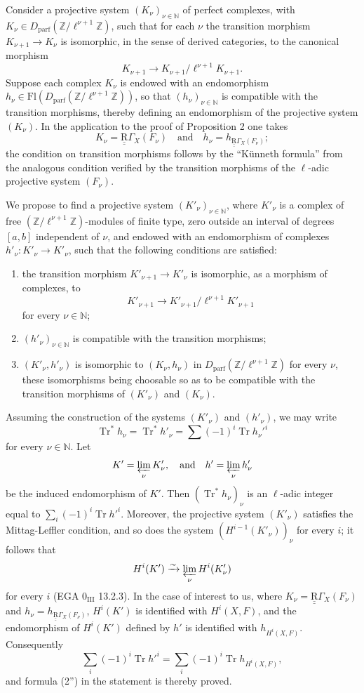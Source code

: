 \documentclass[11pt]{article}
\providecommand{\Tr}{\operatorname{Tr}}
\providecommand{\Tr}{\operatorname{Tr}}
\providecommand{\Tr}{\operatorname{Tr}}
\providecommand{\Tr}{\operatorname{Tr}}
\providecommand{\Tr}{\operatorname{Tr}}
\begin{document}
Consider a projective system $(K_\nu)_{\nu\in\mathbb N}$ of perfect complexes, with $K_\nu\in D_{\mathrm{parf}}(\mathbb Z/\ell^{\nu+1}\mathbb Z)$, such that for each $\nu$ the transition morphism $K_{\nu+1}\to K_\nu$ is isomorphic, in the sense of derived categories, to the canonical morphism
\[
K_{\nu+1}\to K_{\nu+1}/\ell^{\nu+1}K_{\nu+1}.
\]
Suppose each complex $K_\nu$ is endowed with an endomorphism $h_\nu\in\mathrm{Fl}(D_{\mathrm{parf}}(\mathbb Z/\ell^{\nu+1}\mathbb Z))$, so that $(h_\nu)_{\nu\in\mathbb N}$ is compatible with the transition morphisms, thereby defining an endomorphism of the projective system $(K_\nu)$. In the application to the proof of Proposition 2 one takes
\[
K_\nu=\underline{\underline{\mathrm{R}}}\Gamma_X(F_\nu)\quad\text{and}\quad h_\nu=h_{\underline{\underline{\mathrm{R}}}\Gamma_X(F_\nu)};
\]
the condition on transition morphisms follows by the ``Künneth formula'' from the analogous condition verified by the transition morphisms of the $\ell$-adic projective system $(F_\nu)$.

We propose to find a projective system $(K'_\nu)_{\nu\in\mathbb N}$, where $K'_\nu$ is a complex of free $(\mathbb Z/\ell^{\nu+1}\mathbb Z)$-modules of finite type, zero outside an interval of degrees $[a,b]$ independent of $\nu$, and endowed with an endomorphism of complexes $h'_\nu:K'_\nu\to K'_\nu$, such that the following conditions are satisfied:
\begin{enumerate}[label=\arabic*)]
\item the transition morphism $K'_{\nu+1}\to K'_\nu$ is isomorphic, as a morphism of complexes, to
\[
K'_{\nu+1}\to K'_{\nu+1}/\ell^{\nu+1}K'_{\nu+1}
\]
for every $\nu\in\mathbb N$;
\item $(h'_\nu)_{\nu\in\mathbb N}$ is compatible with the transition morphisms;
\item $(K'_\nu,h'_\nu)$ is isomorphic to $(K_\nu,h_\nu)$ in $D_{\mathrm{parf}}(\mathbb Z/\ell^{\nu+1}\mathbb Z)$ for every $\nu$, these isomorphisms being choosable so as to be compatible with the transition morphisms of $(K'_\nu)$ and $(K_\nu)$.
\end{enumerate}
Assuming the construction of the systems $(K'_\nu)$ and $(h'_\nu)$, we may write
\[
\Tr^*h_\nu=\Tr^*h'_\nu=\sum(-1)^i\Tr h_\nu'^i
\]
for every $\nu\in\mathbb N$. Let
\[
K'=\varprojlim_\nu K'_\nu,
\quad\text{and}\quad h'=\varprojlim_\nu h'_\nu
\]
be the induced endomorphism of $K'$. Then $(\Tr^*h_\nu)_\nu$ is an $\ell$-adic integer equal to $\sum_i(-1)^i\Tr h'^i$. Moreover, the projective system $(K'_\nu)$ satisfies the Mittag-Leffler condition, and so does the system $(H^{i-1}(K'_\nu))_\nu$ for every $i$; it follows that
\[
H^i(K')\xrightarrow{\sim}\varprojlim_\nu H^i(K'_\nu)
\]
for every $i$ (EGA $0_{\mathrm{III}}$ 13.2.3). In the case of interest to us, where $K_\nu=\underline{\underline{\mathrm{R}}}\Gamma_X(F_\nu)$ and $h_\nu=h_{\underline{\underline{\mathrm{R}}}\Gamma_X(F_\nu)}$, $H^i(K')$ is identified with $H^i(X,F)$, and the endomorphism of $H^i(K')$ defined by $h'$ is identified with $h_{H^i(X,F)}$. Consequently
\[
\sum_i(-1)^i\Tr h'^i=
\sum_i(-1)^i\Tr h_{H^i(X,F)},
\]
and formula (2'') in the statement is thereby proved.
\end{document}
